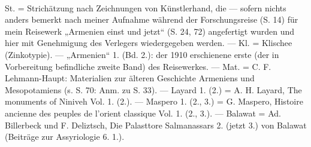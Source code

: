 \documentclass[a4paper, 11pt, oneside, polutonikogreek, german]{article}
\begin{document}
\paragraph{}
St. = Strichätzung nach Zeichnungen von Künstlerhand, die --- sofern nichts anders bemerkt nach meiner Aufnahme während der Forschungsreise (S. 14) für mein Reisewerk „Armenien einst und jetzt“ (S. 24, 72) angefertigt wurden und hier mit Genehmigung des Verlegers wiedergegeben werden. --- Kl. = Klischee (Zinkotypie). --- „Armenien“ 1. (Bd. 2.): der 1910 erschienene erste (der in Vorbereitung befindliche zweite Band) des Reisewerkes. --- Mat. = C. F. Lehmann-Haupt: Materialien zur älteren Geschichte Armeniens und Mesopotamiens (s. S. 70: Anm. zu S. 33). --- Layard 1. (2.) = A. H. Layard, The monuments of Niniveh Vol. 1. (2.). --- Maspero 1. (2., 3.) = G. Maspero, Histoire ancienne des peuples de l'orient classique Vol. 1. (2., 3.). --- Balawat = Ad. Billerbeck und F. Deliztsch, Die Palasttore Salmanassars 2. (jetzt 3.) von Balawat (Beiträge zur Assyriologie 6. 1.).
\clearpage
\end{document}
